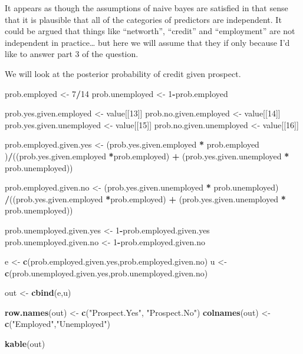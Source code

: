 \documentclass[]{article}
\newenvironment{Shaded}{\begin{snugshade}}{\end{snugshade}}
\newcommand{\KeywordTok}[1]{\textcolor[rgb]{0.13,0.29,0.53}{\textbf{#1}}}
\newcommand{\DecValTok}[1]{\textcolor[rgb]{0.00,0.00,0.81}{#1}}
\newcommand{\StringTok}[1]{\textcolor[rgb]{0.31,0.60,0.02}{#1}}
\newcommand{\OperatorTok}[1]{\textcolor[rgb]{0.81,0.36,0.00}{\textbf{#1}}}
\newcommand{\NormalTok}[1]{#1}
\begin{document}
It appears as though the assumptions of naive bayes are satisfied in
that sense that it is plausible that all of the categories of predictors
are independent. It could be argued that things like ``networth'',
``credit'' and ``employment'' are not independent in practice\ldots{}
but here we will assume that they if only because I'd like to answer
part 3 of the question.

We will look at the posterior probability of credit given prospect.

\begin{Shaded}
\begin{Highlighting}[]
\NormalTok{prob.employed <-}\StringTok{ }\DecValTok{7}\OperatorTok{/}\DecValTok{14}
\NormalTok{prob.unemployed <-}\StringTok{ }\DecValTok{1}\OperatorTok{-}\NormalTok{prob.employed}

\NormalTok{prob.yes.given.employed <-}\StringTok{ }\NormalTok{value[[}\DecValTok{13}\NormalTok{]]}
\NormalTok{prob.no.given.employed <-}\StringTok{ }\NormalTok{value[[}\DecValTok{14}\NormalTok{]]}
\NormalTok{prob.yes.given.unemployed <-}\StringTok{ }\NormalTok{value[[}\DecValTok{15}\NormalTok{]]}
\NormalTok{prob.no.given.unemployed <-}\StringTok{ }\NormalTok{value[[}\DecValTok{16}\NormalTok{]] }

\NormalTok{prob.employed.given.yes <-}\StringTok{ }\NormalTok{(prob.yes.given.employed }\OperatorTok{*}\StringTok{ }\NormalTok{prob.employed )}\OperatorTok{/}\NormalTok{((prob.yes.given.employed }\OperatorTok{*}\NormalTok{prob.employed) }\OperatorTok{+}\StringTok{ }\NormalTok{(prob.yes.given.unemployed }\OperatorTok{*}\StringTok{ }\NormalTok{prob.unemployed)) }

\NormalTok{prob.employed.given.no <-}\StringTok{  }\NormalTok{(prob.yes.given.unemployed }\OperatorTok{*}\StringTok{ }\NormalTok{prob.unemployed) }\OperatorTok{/}\NormalTok{((prob.yes.given.employed }\OperatorTok{*}\NormalTok{prob.employed) }\OperatorTok{+}\StringTok{ }\NormalTok{(prob.yes.given.unemployed }\OperatorTok{*}\StringTok{ }\NormalTok{prob.unemployed)) }


\NormalTok{prob.unemployed.given.yes <-}\StringTok{ }\DecValTok{1}\OperatorTok{-}\NormalTok{prob.employed.given.yes}
\NormalTok{prob.unemployed.given.no <-}\StringTok{ }\DecValTok{1}\OperatorTok{-}\NormalTok{prob.employed.given.no}

\NormalTok{e <-}\StringTok{ }\KeywordTok{c}\NormalTok{(prob.employed.given.yes,prob.employed.given.no)}
\NormalTok{u <-}\StringTok{ }\KeywordTok{c}\NormalTok{(prob.unemployed.given.yes,prob.unemployed.given.no)}

\NormalTok{out <-}\StringTok{ }\KeywordTok{cbind}\NormalTok{(e,u)}

\KeywordTok{row.names}\NormalTok{(out) <-}\StringTok{ }\KeywordTok{c}\NormalTok{(}\StringTok{"Prospect.Yes"}\NormalTok{, }\StringTok{"Prospect.No"}\NormalTok{)}
\KeywordTok{colnames}\NormalTok{(out) <-}\StringTok{ }\KeywordTok{c}\NormalTok{(}\StringTok{"Employed"}\NormalTok{,}\StringTok{"Unemployed"}\NormalTok{)}

\KeywordTok{kable}\NormalTok{(out)}
\end{Highlighting}
\end{Shaded}
\end{document}
